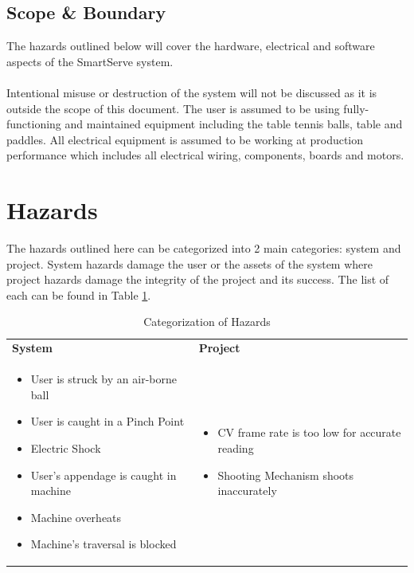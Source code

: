 \documentclass[11pt]{article}
\begin{document}
\subsection{Scope \& Boundary}
The hazards outlined below will cover the hardware, electrical and software aspects of the SmartServe system. \\ \\
Intentional misuse or destruction of the system will not be discussed as it is outside the scope of this document. The user is assumed to be using fully-functioning and maintained equipment including the table tennis balls, table and paddles. All electrical equipment is assumed to be working at production performance which includes all electrical wiring, components, boards and motors.

\section{Hazards}
The hazards outlined here can be categorized into 2 main categories: system and project. System hazards damage the user or the assets of the system where project hazards damage the integrity of the project and its success. The list of each can be found in Table \ref{table:hazard}. \\
\begin{table}[H]
\centering
\caption{Categorization of Hazards}
\label{table:hazard}
\begin{tabular}{ | >{\raggedright\arraybackslash}p{} | >{\raggedright\arraybackslash}p{} | }
\hline
\multicolumn{2}{|c|}{\textbf{Hazards}} \\ \hline
\textbf{System}   & \textbf{Project}   \\ \hline
\begin{itemize}
\item User is struck by an air-borne ball
\item User is caught in a Pinch Point
\item Electric Shock
\item User's appendage is caught in machine
\item Machine overheats
\item Machine's traversal is blocked
\end{itemize}
&
\begin{itemize}
\item CV frame rate is too low for accurate reading
\item Shooting Mechanism shoots inaccurately
\end{itemize}
\\ \hline
\end{tabular}
\end{table}
\end{document}
